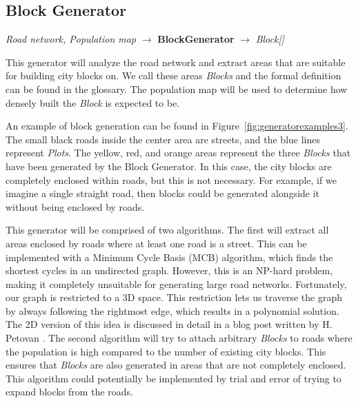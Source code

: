 \subsection{Block Generator}
\begin{center}
    \textit{Road network, Population map} $\rightarrow$ \textbf{BlockGenerator} $\rightarrow$ \textit{Block{[}{]}}
\end{center}
This generator will analyze the road network and extract areas that are suitable for building city blocks on.
We call these areas \textit{Blocks} and the formal definition can be found in the glossary.
The population map will be used to determine how densely built the \textit{Block} is expected to be.

An example of block generation can be found in Figure~\ref{fig:generatorexamples3}.
The small black roads inside the center area are streets, and the blue lines represent \textit{Plots}.
The yellow, red, and orange areas represent the three \textit{Blocks} that have been generated by the Block Generator.
In this case, the city blocks are completely enclosed within roads, but this is not necessary.
For example, if we imagine a single straight road, then blocks could be generated alongside it without being enclosed by roads.

This generator will be comprised of two algorithms.
The first will extract all areas enclosed by roads where at least one road is a street.
This can be implemented with a Minimum Cycle Basis (MCB) algorithm, which finds the shortest cycles in an undirected graph.
However, this is an NP-hard problem, making it completely unsuitable for generating large road networks.
Fortunately, our graph is restricted to a 3D space.
This restriction lets us traverse the graph by always following the rightmost edge, which results in a polynomial solution.
The 2D version of this idea is discussed in detail in a blog post written by H. Petovan \cite{mcb}.
The second algorithm will try to attach arbitrary \textit{Blocks} to roads where the population is high compared to the number of existing city blocks.
This ensures that \textit{Blocks} are also generated in areas that are not completely enclosed.
This algorithm could potentially be implemented by trial and error of trying to expand blocks from the roads.